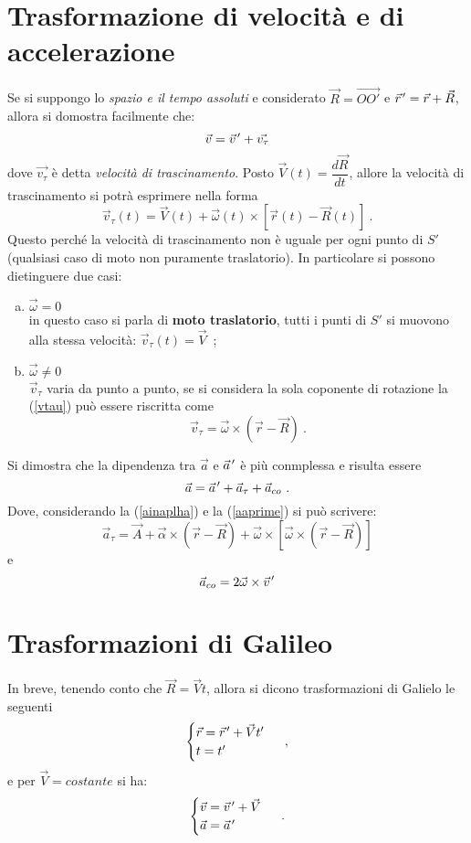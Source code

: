 \documentclass[12pt, oneside]{book}
\newcommand{\pvec}[1]{\vec{#1}\mkern2mu\vphantom{#1}}
\begin{document}
\section{Trasformazione di velocità e di accelerazione}
Se si suppongo lo \emph{spazio e il tempo assoluti} e considerato $\vec{R}=\overrightarrow{OO'}$ e $\pvec{r}'=\vec{r}+\vec{R}$, allora si domostra facilmente che:
\[\vec{v}=\pvec{v}'+\vec{v_\tau}\]
dove $\vec{v_\tau}$ è detta \emph{velocità di trascinamento}.
Posto $\vec{V}(t)=\dfrac{d\vec{R}}{dt}$, allore la velocità di trascinamento si potrà esprimere nella forma
\begin{equation}
\label{vtau}
\vec{v}_\tau(t)=\vec{V}(t)+\vec{\omega}(t)\times[\vec{r}(t)-\vec{R}(t)]~.
\end{equation}
Questo perché la velocità di trascinamento non è uguale per ogni punto di $S'$ (qualsiasi caso di moto non puramente traslatorio). In particolare si possono dietinguere due casi:
\begin{enumerate}[a)]
	\item $\vec{\omega}=0$\\
	in questo caso si parla di \textbf{moto traslatorio}, tutti i punti di $S'$ si muovono alla stessa velocità: $\vec{v}_\tau(t)=\vec{V}$~;
	\item $\vec{\omega}\neq 0$\\
	$\vec{v}_\tau$ varia da punto a punto, se si considera la sola coponente di rotazione la (\ref{vtau}) può essere riscritta come
	\[\vec{v}_\tau=\vec{\omega}\times(\vec{r}-\vec{R})~.\]
\end{enumerate}
Si dimostra che la dipendenza tra $\vec{a}$ e $\pvec{a}'$ è più conmplessa e risulta essere
\begin{equation}
\label{aaprime}
\vec{a}=\pvec{a}' + \vec{a}_\tau + \vec{a}_{co}~.
\end{equation}
\newpage
Dove, considerando la (\ref{ainaplha}) e la (\ref{aaprime}) si può scrivere:
\[\vec a_\tau=\vec A+\vec \alpha \times(\vec{r}-\vec{R})+\vec{\omega}\times[\vec{\omega}\times (\vec{r}-\vec{R})]\]
e
\[\vec{a}_{co}=2\vec{\omega}\times\pvec v'\]
\section{Trasformazioni di Galileo}
In breve, tenendo conto che $\vec R = \vec V t$, allora si dicono trasformazioni di Galielo le seguenti
\begin{align*}
	\begin{cases}
		\vec r = \pvec r' + \vec V t'\\
		t=t'
	\end{cases}~,
\end{align*}
e per $\vec V = costante$ si ha:
\begin{align*}
	\begin{cases}
		\vec v = \pvec v' + \vec V\\
		\vec a = \pvec a'
	\end{cases}~.
\end{align*}
\end{document}
